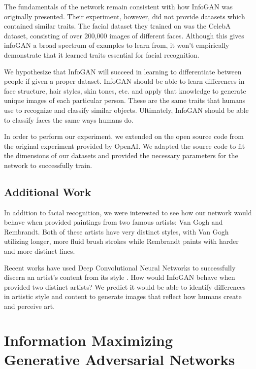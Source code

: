 \documentclass[conference,11pt]{IEEEtran}
\begin{document}
The fundamentals of the network remain consistent with how InfoGAN was originally presented.  Their experiment, however, did not provide datasets which contained similar traits.  The facial dataset they trained on was the CelebA dataset, consisting of over 200,000 images of different faces.  Although this gives infoGAN a broad spectrum of examples to learn from, it won't empirically demonstrate that it learned traits essential for facial recognition.

We hypothesize that InfoGAN will succeed in learning to differentiate between people if given a proper dataset.  InfoGAN should be able to learn differences in face structure, hair styles, skin tones, etc. and apply that knowledge to generate unique images of each particular person.  These are the same traits that humans use to recognize and classify similar objects.  Ultimately, InfoGAN should be able to classify faces the same ways humans do.

In order to perform our experiment, we extended on the open source code from the original experiment provided by OpenAI.  We adapted the source code to fit the dimensions of our datasets and provided the necessary parameters for the network to successfully train.

\subsection{Additional Work}
In addition to facial recognition, we were interested to see how our network would behave when provided paintings from two famous artists: Van Gogh and Rembrandt.  Both of these artists have very distinct styles, with Van Gogh utilizing longer, more fluid brush strokes while Rembrandt paints with harder and more distinct lines.

Recent works have used Deep Convolutional Neural Networks to successfully discern an artist's content from its style \cite{art}.  How would InfoGAN behave when provided two distinct artists?  We predict it would be able to identify differences in artistic style and content to generate images that reflect how humans create and perceive art.

\section{Information Maximizing Generative Adversarial Networks}
\end{document}
